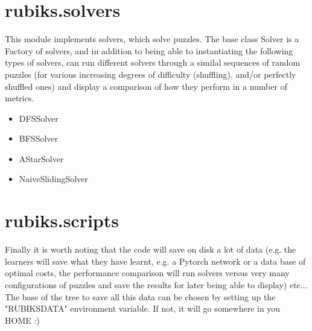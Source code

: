 \section{rubiks.solvers}
This module implements solvers, which solve puzzles. The base class Solver is a Factory of solvers, and in addition to being able to instantiating the following types of solvers, can run different solvers through a similal sequences of random puzzles (for various increasing degrees of difficulty (shuffling), and/or perfectly shuffled ones) and display a comparison of how they perform in a number of metrics.

\begin{itemize}
\item DFSSolver
\item BFSSolver
\item AStarSolver
\item NaiveSlidingSolver
\end{itemize}

\section{rubiks.scripts}


Finally it is worth noting that the code will save on disk a lot of data (e.g. the learners will save what they have learnt, e.g. a Pytorch network or a data base of optimal costs, the performance comparison will run solvers versus very many configurations of puzzles and save the results for later being able to display) etc... The base of the tree to save all this data can be chosen by setting up the "RUBIKSDATA" environment variable. If not, it will go somewhere in you HOME :)
